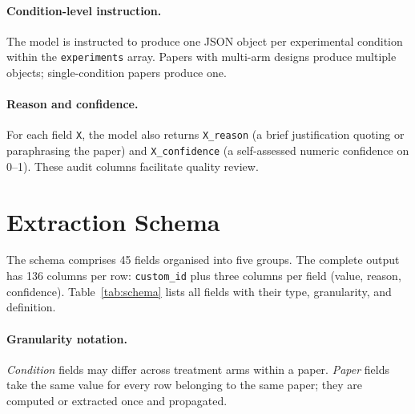 \documentclass[11pt,a4paper]{article}
\begin{document}
\paragraph{Condition-level instruction.}
The model is instructed to produce one JSON object per experimental condition within the \texttt{experiments} array. Papers with multi-arm designs produce multiple objects; single-condition papers produce one.

\paragraph{Reason and confidence.}
For each field \texttt{X}, the model also returns \texttt{X\_reason} (a brief justification quoting or paraphrasing the paper) and \texttt{X\_confidence} (a self-assessed numeric confidence on 0–1). These audit columns facilitate quality review.

\section{Extraction Schema}
\label{sec:schema}

The schema comprises 45 fields organised into five groups. The complete output has 136 columns per row: \texttt{custom\_id} plus three columns per field (value, reason, confidence). Table~\ref{tab:schema} lists all fields with their type, granularity, and definition.

\paragraph{Granularity notation.} \textit{Condition} fields may differ across treatment arms within a paper. \textit{Paper} fields take the same value for every row belonging to the same paper; they are computed or extracted once and propagated.
\end{document}
